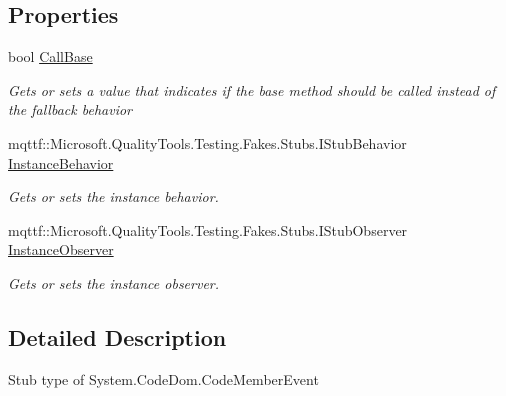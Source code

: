 \subsection*{Properties}
\begin{DoxyCompactItemize}
\item 
bool \hyperlink{class_system_1_1_code_dom_1_1_fakes_1_1_stub_code_member_event_a654f48140568ed2a0af47ddea796113f}{Call\-Base}
\begin{DoxyCompactList}\small\item\em Gets or sets a value that indicates if the base method should be called instead of the fallback behavior\end{DoxyCompactList}\item 
mqttf\-::\-Microsoft.\-Quality\-Tools.\-Testing.\-Fakes.\-Stubs.\-I\-Stub\-Behavior \hyperlink{class_system_1_1_code_dom_1_1_fakes_1_1_stub_code_member_event_a28b6d0e897c989938bc7a29a5e4a1c30}{Instance\-Behavior}
\begin{DoxyCompactList}\small\item\em Gets or sets the instance behavior.\end{DoxyCompactList}\item 
mqttf\-::\-Microsoft.\-Quality\-Tools.\-Testing.\-Fakes.\-Stubs.\-I\-Stub\-Observer \hyperlink{class_system_1_1_code_dom_1_1_fakes_1_1_stub_code_member_event_ab3c0b54fe0c7a8182c1eae58c17522a2}{Instance\-Observer}
\begin{DoxyCompactList}\small\item\em Gets or sets the instance observer.\end{DoxyCompactList}\end{DoxyCompactItemize}


\subsection{Detailed Description}
Stub type of System.\-Code\-Dom.\-Code\-Member\-Event



